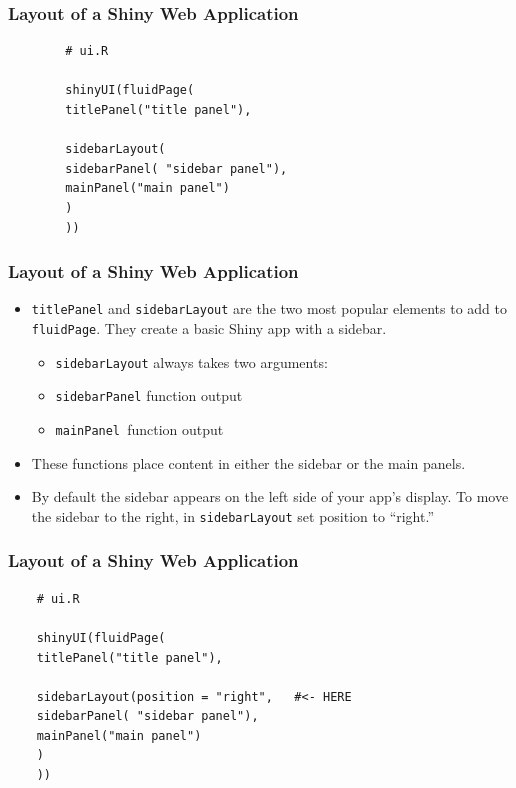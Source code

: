 \documentclass{beamer}
\begin{document}
\begin{frame}[fragile]	
\frametitle{Layout of a Shiny Web Application}
	\begin{framed}
		\begin{verbatim}
		# ui.R
		
		shinyUI(fluidPage(
		titlePanel("title panel"),
		
		sidebarLayout(
		sidebarPanel( "sidebar panel"),
		mainPanel("main panel")
		)
		))
		\end{verbatim}
	\end{framed}
	
\end{frame}
\begin{frame}[fragile]
\frametitle{Layout of a Shiny Web Application}
\begin{itemize}	
	\item \texttt{titlePanel} and \texttt{sidebarLayout} are the two most popular elements to add to \texttt{fluidPage}. They create a basic Shiny app with a sidebar.
	\begin{itemize}
	\item \texttt{sidebarLayout} always takes two arguments:
	\item \texttt{sidebarPanel} function output
	\item \texttt{mainPanel }function output
	\end{itemize}
	\item These functions place content in either the sidebar or the main panels.
	\item 
	By default the sidebar appears on the left side of your app’s display. To move the sidebar to the right, in \texttt{sidebarLayout} set position to “right.”
\end{itemize}
\end{frame}
\begin{frame}[fragile]
\frametitle{Layout of a Shiny Web Application}
\begin{framed}
	\begin{verbatim}
	# ui.R
	
	shinyUI(fluidPage(
	titlePanel("title panel"),
	
	sidebarLayout(position = "right",   #<- HERE
	sidebarPanel( "sidebar panel"),
	mainPanel("main panel")
	)
	))
	\end{verbatim}
\end{framed}

\end{frame}
\end{document}
